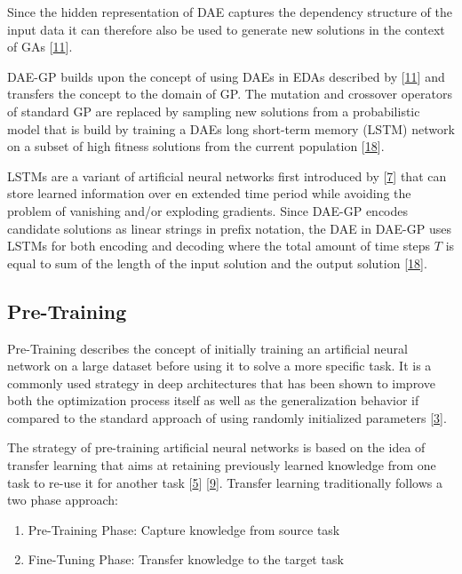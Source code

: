 \documentclass[
  11pt,
]{article}
\providecommand{\tightlist}{%
  \setlength{\itemsep}{0pt}\setlength{\parskip}{0pt}}
\begin{document}
Since the hidden representation of DAE captures the dependency structure of the input data it can therefore also be used to generate new solutions in the context of GAs {[}\protect\hyperlink{ref-harmless_overfitting_eda}{11}{]}.

DAE-GP builds upon the concept of using DAEs in EDAs described by {[}\protect\hyperlink{ref-harmless_overfitting_eda}{11}{]} and transfers the concept to the domain of GP.
The mutation and crossover operators of standard GP are replaced by sampling new solutions from a probabilistic model that is build by training a DAEs long short-term memory (LSTM) network on a subset of high fitness solutions from the current population {[}\protect\hyperlink{ref-dae-gp_2020_rtree}{18}{]}.

LSTMs are a variant of artificial neural networks first introduced by {[}\protect\hyperlink{ref-lstm_orig}{7}{]} that can store learned information over en extended time period while avoiding the problem of vanishing and/or exploding gradients. Since DAE-GP encodes candidate solutions as linear strings in prefix notation, the DAE in DAE-GP uses LSTMs for both encoding and decoding where the total amount of time steps \(T\) is equal to sum of the length of the input solution and the output solution {[}\protect\hyperlink{ref-dae-gp_2020_rtree}{18}{]}.

\hypertarget{pre-training}{%
\subsection{Pre-Training}\label{pre-training}}

Pre-Training describes the concept of initially training an artificial neural network on a large dataset before using it to solve a more specific task.
It is a commonly used strategy in deep architectures that has been shown to improve both the optimization process itself as well as the generalization behavior if compared to the standard approach of using randomly initialized parameters {[}\protect\hyperlink{ref-pmlr-v5-erhan09a}{3}{]}.

The strategy of pre-training artificial neural networks is based on the idea of transfer learning that aims at retaining previously learned knowledge from one task to re-use it for another task {[}\protect\hyperlink{ref-HAN2021225}{5}{]} {[}\protect\hyperlink{ref-survey_transfer_learning}{9}{]}.
Transfer learning traditionally follows a two phase approach:

\begin{enumerate}
\def\labelenumi{\arabic{enumi}.}
\tightlist
\item
  Pre-Training Phase: Capture knowledge from source task
\item
  Fine-Tuning Phase: Transfer knowledge to the target task
\end{enumerate}
\end{document}
